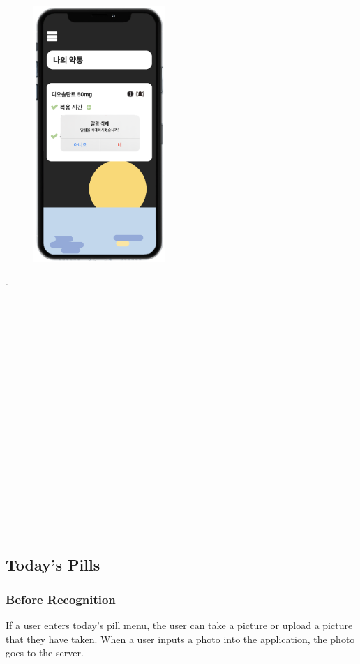 \documentclass[conference]{IEEEtran}
\begin{document}
\begin{figure}[h!]
\centering
\includegraphics[width=5cm]{final_image_folder/pillbox_alarm_remove.png}
\caption{}
\label{fig:map}
\end{figure}
.\\
\\
\\
\\
\\
\\
\\
\\
\\
\\
\\
\\
\\
\\
\\
\\
\\
\\
\\

\subsection{Today's Pills}
\subsubsection{Before Recognition}
If a user enters today's pill menu, the user can take a picture or upload a picture that they have taken. When a user inputs a photo into the application, the photo goes to the server.\\ 
\end{document}
